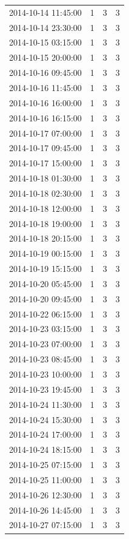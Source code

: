 \begin{tabular}{lrrr}
2014-10-14 11:45:00 & 1 & 3 & 3 \\
2014-10-14 23:30:00 & 1 & 3 & 3 \\
2014-10-15 03:15:00 & 1 & 3 & 3 \\
2014-10-15 20:00:00 & 1 & 3 & 3 \\
2014-10-16 09:45:00 & 1 & 3 & 3 \\
2014-10-16 11:45:00 & 1 & 3 & 3 \\
2014-10-16 16:00:00 & 1 & 3 & 3 \\
2014-10-16 16:15:00 & 1 & 3 & 3 \\
2014-10-17 07:00:00 & 1 & 3 & 3 \\
2014-10-17 09:45:00 & 1 & 3 & 3 \\
2014-10-17 15:00:00 & 1 & 3 & 3 \\
2014-10-18 01:30:00 & 1 & 3 & 3 \\
2014-10-18 02:30:00 & 1 & 3 & 3 \\
2014-10-18 12:00:00 & 1 & 3 & 3 \\
2014-10-18 19:00:00 & 1 & 3 & 3 \\
2014-10-18 20:15:00 & 1 & 3 & 3 \\
2014-10-19 00:15:00 & 1 & 3 & 3 \\
2014-10-19 15:15:00 & 1 & 3 & 3 \\
2014-10-20 05:45:00 & 1 & 3 & 3 \\
2014-10-20 09:45:00 & 1 & 3 & 3 \\
2014-10-22 06:15:00 & 1 & 3 & 3 \\
2014-10-23 03:15:00 & 1 & 3 & 3 \\
2014-10-23 07:00:00 & 1 & 3 & 3 \\
2014-10-23 08:45:00 & 1 & 3 & 3 \\
2014-10-23 10:00:00 & 1 & 3 & 3 \\
2014-10-23 19:45:00 & 1 & 3 & 3 \\
2014-10-24 11:30:00 & 1 & 3 & 3 \\
2014-10-24 15:30:00 & 1 & 3 & 3 \\
2014-10-24 17:00:00 & 1 & 3 & 3 \\
2014-10-24 18:15:00 & 1 & 3 & 3 \\
2014-10-25 07:15:00 & 1 & 3 & 3 \\
2014-10-25 11:00:00 & 1 & 3 & 3 \\
2014-10-26 12:30:00 & 1 & 3 & 3 \\
2014-10-26 14:45:00 & 1 & 3 & 3 \\
2014-10-27 07:15:00 & 1 & 3 & 3 \\

\end{tabular}
